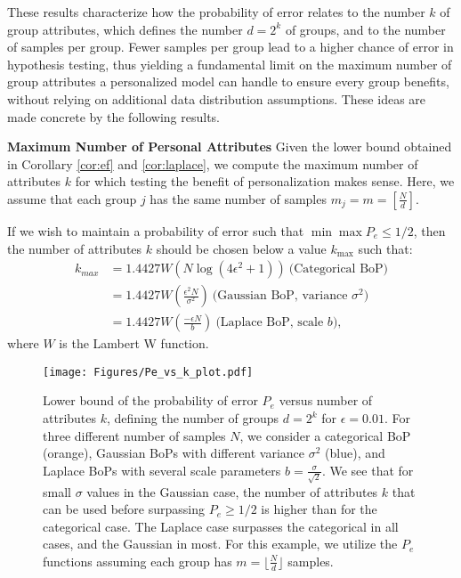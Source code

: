 These results characterize how the probability of error relates to the number $k$ of group attributes, which defines the number $d=2^k$ of groups, and to the number of samples per group. Fewer samples per group lead to a higher chance of error in hypothesis testing, thus yielding a fundamental limit on the maximum number of group attributes a personalized model can handle to ensure every group benefits, without relying on additional data distribution assumptions. These ideas are made concrete by the following results.


\textbf{Maximum Number of Personal Attributes} Given the lower bound obtained in Corollary \ref{cor:ef} and \ref{cor:laplace}, we compute the maximum number of attributes $k$ for which testing the benefit of personalization makes sense. Here, we assume that each group $j$ has the same number of samples $m_j = m = \left[\frac{N}{d}\right]$.



\begin{corollary}
    If we wish to maintain a probability of error such that $\min \max P_e \leq 1/2$, then the number of attributes $k$ should be chosen below a value $k_{\max}$ such that:
    \begin{align*}
        k_{max} 
         &= 1.4427 W\left(N \log(4 \epsilon^2+1)\right)~\text{(Categorical BoP)}\\
         &= 1.4427W\left(\frac{\epsilon^2 N}{\sigma^2}\right)~\text{(Gaussian BoP, variance $\sigma^2$)}\\
         &= 1.4427W\left(\frac{-\epsilon N}{b}\right)~\text{(Laplace BoP, scale $b$)},
    \end{align*}
where $W$ is the Lambert W function.
\end{corollary}


\begin{figure*}
    \centering
    \texttt{[image: Figures/Pe\_vs\_k\_plot.pdf]}
    \vspace{-0.5cm}
    \caption{Lower bound of the probability of error $P_e$ versus number of attributes $k$, defining the number of groups $d = 2^k$ for $\epsilon=0.01$. For three different number of samples $N$, we consider a categorical BoP (orange), Gaussian BoPs with different variance $\sigma^2$ (blue), and Laplace BoPs with several scale parameters $b = \frac{\sigma}{\sqrt{2}}$. 
    We see that for small $\sigma$ values in the Gaussian case, the number of attributes $k$ that can be used before surpassing $P_e\geq 1/2$ is higher than for the categorical case. The Laplace case surpasses the categorical in all cases, and the Gaussian in most. For this example, we utilize the $P_e$ functions assuming each group has $m = \lfloor \frac{N}{d} \rfloor$ samples.}
    \label{fig:pe_versus_k}
\end{figure*}

